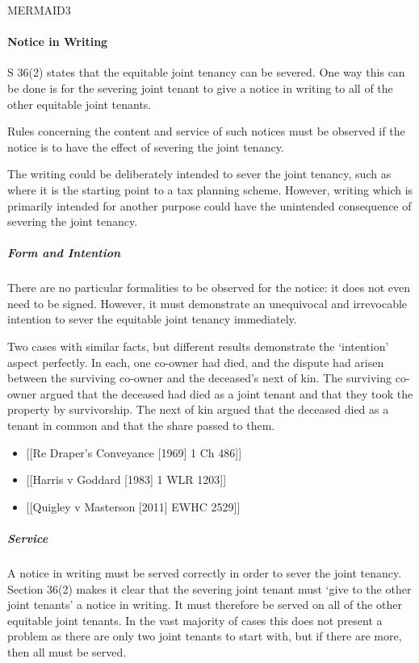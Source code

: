 \documentclass[
]{article}
\providecommand{\tightlist}{%
  \setlength{\itemsep}{0pt}\setlength{\parskip}{0pt}}
\begin{document}
MERMAID3

\hypertarget{notice-in-writing}{%
\paragraph{Notice in Writing}\label{notice-in-writing}}

S 36(2) states that the equitable joint tenancy can be severed. One way
this can be done is for the severing joint tenant to give a notice in
writing to all of the other equitable joint tenants.

Rules concerning the content and service of such notices must be
observed if the notice is to have the effect of severing the joint
tenancy.

The writing could be deliberately intended to sever the joint tenancy,
such as where it is the starting point to a tax planning scheme.
However, writing which is primarily intended for another purpose could
have the unintended consequence of severing the joint tenancy.

\hypertarget{form-and-intention}{%
\subparagraph{Form and Intention}\label{form-and-intention}}

There are no particular formalities to be observed for the notice: it
does not even need to be signed. However, it must demonstrate an
unequivocal and irrevocable intention to sever the equitable joint
tenancy immediately.

Two cases with similar facts, but different results demonstrate the
`intention' aspect perfectly. In each, one co-owner had died, and the
dispute had arisen between the surviving co-owner and the deceased's
next of kin. The surviving co-owner argued that the deceased had died as
a joint tenant and that they took the property by survivorship. The next
of kin argued that the deceased died as a tenant in common and that the
share passed to them.

\begin{itemize}
\tightlist
\item
  {[}{[}Re Draper's Conveyance {[}1969{]} 1 Ch 486{]}{]}
\item
  {[}{[}Harris v Goddard {[}1983{]} 1 WLR 1203{]}{]}
\item
  {[}{[}Quigley v Masterson {[}2011{]} EWHC 2529{]}{]}
\end{itemize}

\hypertarget{service}{%
\subparagraph{Service}\label{service}}

A notice in writing must be served correctly in order to sever the joint
tenancy. Section 36(2) makes it clear that the severing joint tenant
must `give to the other joint tenants' a notice in writing. It must
therefore be served on all of the other equitable joint tenants. In the
vast majority of cases this does not present a problem as there are only
two joint tenants to start with, but if there are more, then all must be
served.
\end{document}
